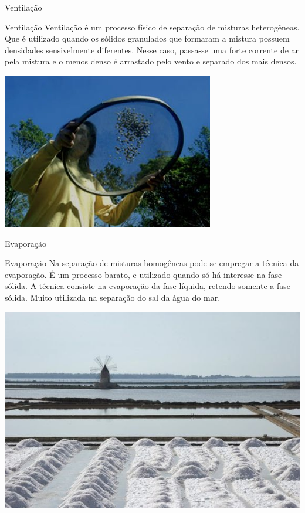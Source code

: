 \documentclass{beamer}
\begin{document}
\begin{frame}[label={sec:org5d62291}]{Ventilação}
\begin{block}{Ventilação}
\alert{Ventilação} é um processo físico de separação de misturas heterogêneas. Que é utilizado quando os sólidos granulados que formaram a mistura possuem densidades sensivelmente diferentes. Nesse caso, passa-se uma forte corrente de ar pela mistura e o menos denso é arrastado pelo vento e separado dos mais densos.

\begin{center}
\includegraphics[scale=0.5]{../img/ventila.jpg}
\end{center}
\end{block}
\end{frame}
\begin{frame}[label={sec:org88c2a08}]{Evaporação}
\begin{block}{Evaporação}
Na separação de misturas homogêneas pode se empregar a técnica da evaporação. É um processo barato, e utilizado quando só há interesse na fase sólida.
A técnica consiste na evaporação da fase líquida, retendo somente a fase sólida. Muito utilizada na separação do sal da água do mar.

\begin{center}
\includegraphics[scale=0.5]{../img/evaporacao_sal.jpg}
\end{center}
\end{block}
\end{frame}
\end{document}
